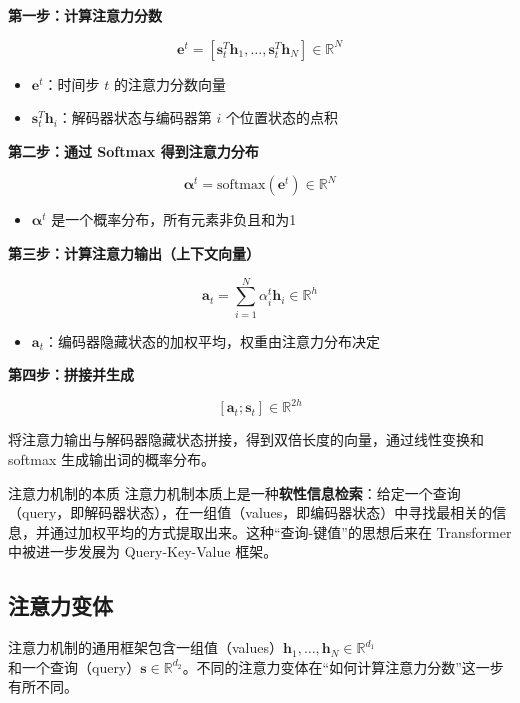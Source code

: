 \documentclass[a4paper]{article}
\begin{document}
\textbf{第一步：计算注意力分数}

$$\mathbf{e}^t = [\mathbf{s}_t^T \mathbf{h}_1, \ldots, \mathbf{s}_t^T \mathbf{h}_N] \in \mathbb{R}^N$$

\begin{itemize}
    \item $\mathbf{e}^t$：时间步 $t$ 的注意力分数向量
    \item $\mathbf{s}_t^T \mathbf{h}_i$：解码器状态与编码器第 $i$ 个位置状态的点积
\end{itemize}

\textbf{第二步：通过 Softmax 得到注意力分布}

$$\boldsymbol{\alpha}^t = \mathrm{softmax}(\mathbf{e}^t) \in \mathbb{R}^N$$

\begin{itemize}
    \item $\boldsymbol{\alpha}^t$ 是一个概率分布，所有元素非负且和为1
\end{itemize}

\textbf{第三步：计算注意力输出（上下文向量）}

$$\mathbf{a}_t = \sum_{i=1}^{N} \alpha_i^t \mathbf{h}_i \in \mathbb{R}^h$$

\begin{itemize}
    \item $\mathbf{a}_t$：编码器隐藏状态的加权平均，权重由注意力分布决定
\end{itemize}

\textbf{第四步：拼接并生成}

$$[\mathbf{a}_t; \mathbf{s}_t] \in \mathbb{R}^{2h}$$

将注意力输出与解码器隐藏状态拼接，得到双倍长度的向量，通过线性变换和 softmax 生成输出词的概率分布。

\begin{importantbox}{注意力机制的本质}
注意力机制本质上是一种\textbf{软性信息检索}：给定一个查询（query，即解码器状态），在一组值（values，即编码器状态）中寻找最相关的信息，并通过加权平均的方式提取出来。这种``查询-键值''的思想后来在 Transformer 中被进一步发展为 Query-Key-Value 框架。
\end{importantbox}

\subsection{注意力变体}

注意力机制的通用框架包含一组值（values）$\mathbf{h}_1, \ldots, \mathbf{h}_N \in \mathbb{R}^{d_1}$ 和一个查询（query）$\mathbf{s} \in \mathbb{R}^{d_2}$。不同的注意力变体在``如何计算注意力分数''这一步有所不同。
\end{document}
